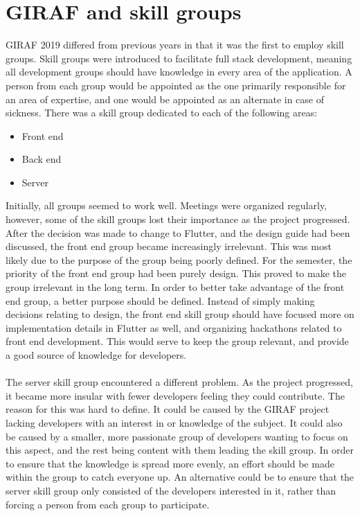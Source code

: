 \section{GIRAF and skill groups}
GIRAF 2019 differed from previous years in that it was the first to employ skill groups.
Skill groups were introduced to facilitate full stack development, meaning all development groups should have knowledge in every area of the application.
A person from each group would be appointed as the one primarily responsible for an area of expertise, and one would be appointed as an alternate in case of sickness.
There was a skill group dedicated to each of the following areas:
\begin{itemize}
    \item Front end
    \item Back end
    \item Server
\end{itemize} 
\noindent
Initially, all groups seemed to work well. 
Meetings were organized regularly, however, some of the skill groups lost their importance as the project progressed.
After the decision was made to change to Flutter, and the design guide had been discussed, the front end group became increasingly irrelevant.
This was most likely due to the purpose of the group being poorly defined.
For the semester, the priority of the front end group had been purely design.
This proved to make the group irrelevant in the long term.
In order to better take advantage of the front end group, a better purpose should be defined.
Instead of simply making decisions relating to design, the front end skill group should have focused more on implementation details in Flutter as well, and organizing hackathons related to front end development.
This would serve to keep the group relevant, and provide a good source of knowledge for developers.
\\\\
The server skill group encountered a different problem.
As the project progressed, it became more insular with fewer developers feeling they could contribute.
The reason for this was hard to define.
It could be caused by the GIRAF project lacking developers with an interest in or knowledge of the subject.
It could also be caused by a smaller, more passionate group of developers wanting to focus on this aspect, and the rest being content with them leading the skill group.
In order to ensure that the knowledge is spread more evenly, an effort should be made within the group to catch everyone up.
An alternative could be to ensure that the server skill group only consisted of the developers interested in it, rather than forcing a person from each group to participate. 
